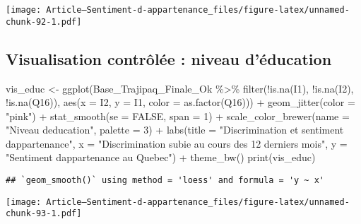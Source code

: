 \documentclass[
]{article}
\newenvironment{Shaded}{\begin{snugshade}}{\end{snugshade}}
\newcommand{\AttributeTok}[1]{\textcolor[rgb]{0.77,0.63,0.00}{#1}}
\newcommand{\ConstantTok}[1]{\textcolor[rgb]{0.00,0.00,0.00}{#1}}
\newcommand{\DecValTok}[1]{\textcolor[rgb]{0.00,0.00,0.81}{#1}}
\newcommand{\FunctionTok}[1]{\textcolor[rgb]{0.00,0.00,0.00}{#1}}
\newcommand{\NormalTok}[1]{#1}
\newcommand{\OtherTok}[1]{\textcolor[rgb]{0.56,0.35,0.01}{#1}}
\newcommand{\SpecialCharTok}[1]{\textcolor[rgb]{0.00,0.00,0.00}{#1}}
\newcommand{\StringTok}[1]{\textcolor[rgb]{0.31,0.60,0.02}{#1}}
\begin{document}
\texttt{[image: Article---Sentiment-d-appartenance\_files/figure-latex/unnamed-chunk-92-1.pdf]}

\hypertarget{visualisation-contruxf4luxe9e-niveau-duxe9ducation}{%
\subsection{Visualisation contrôlée : niveau
d'éducation}\label{visualisation-contruxf4luxe9e-niveau-duxe9ducation}}

\begin{Shaded}
\begin{Highlighting}[]
\NormalTok{vis\_educ }\OtherTok{\textless{}{-}} \FunctionTok{ggplot}\NormalTok{(Base\_Trajipaq\_Finale\_Ok }\SpecialCharTok{\%\textgreater{}\%}
                \FunctionTok{filter}\NormalTok{(}\SpecialCharTok{!}\FunctionTok{is.na}\NormalTok{(I1), }\SpecialCharTok{!}\FunctionTok{is.na}\NormalTok{(I2), }\SpecialCharTok{!}\FunctionTok{is.na}\NormalTok{(Q16)), }\FunctionTok{aes}\NormalTok{(}\AttributeTok{x =}\NormalTok{ I2, }\AttributeTok{y =}\NormalTok{ I1, }\AttributeTok{color =} \FunctionTok{as.factor}\NormalTok{(Q16))) }\SpecialCharTok{+}
  \FunctionTok{geom\_jitter}\NormalTok{(}\AttributeTok{color =} \StringTok{"pink"}\NormalTok{) }\SpecialCharTok{+}
  \FunctionTok{stat\_smooth}\NormalTok{(}\AttributeTok{se =} \ConstantTok{FALSE}\NormalTok{, }\AttributeTok{span =} \DecValTok{1}\NormalTok{) }\SpecialCharTok{+}
  \FunctionTok{scale\_color\_brewer}\NormalTok{(}\AttributeTok{name =} \StringTok{"Niveau d\textquotesingle{}education"}\NormalTok{, }\AttributeTok{palette =} \DecValTok{3}\NormalTok{) }\SpecialCharTok{+}
  \FunctionTok{labs}\NormalTok{(}\AttributeTok{title =} \StringTok{"Discrimination et sentiment d\textquotesingle{}appartenance"}\NormalTok{, }
       \AttributeTok{x =} \StringTok{"Discrimination subie au cours des 12 derniers mois"}\NormalTok{, }
       \AttributeTok{y =} \StringTok{"Sentiment d\textquotesingle{}appartenance au Quebec"}\NormalTok{) }\SpecialCharTok{+}
  \FunctionTok{theme\_bw}\NormalTok{()}
\FunctionTok{print}\NormalTok{(vis\_educ)}
\end{Highlighting}
\end{Shaded}

\begin{verbatim}
## `geom_smooth()` using method = 'loess' and formula = 'y ~ x'
\end{verbatim}

\texttt{[image: Article---Sentiment-d-appartenance\_files/figure-latex/unnamed-chunk-93-1.pdf]}
\end{document}
